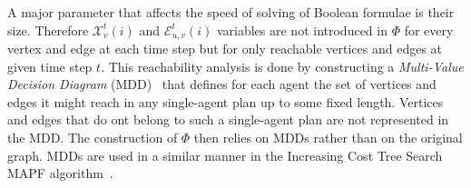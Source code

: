 \documentclass[review]{elsarticle}
\newcommand\konstantin[1]{\nb{\textbf{Konstantin:}}{red}{#1}}
\newcommand\roni[1]{\nb{\textbf{Roni:}}{green}{#1}}
\newcommand\pavel[1]{\nb{\textbf{Pavel:}}{blue}{#1}}
\newcommand{\mddsat}{MDD-SAT\xspace}
\newcommand{\mapf}{\ac{MAPF}\xspace}
\begin{document}
A major parameter that affects the speed of solving of Boolean formulae is their size. Therefore $\mathcal{X}_{v}^{t}(i)$ and $\mathcal{E}_{u,v}^{t}(i)$ variables are not introduced in $\Phi$ for every vertex and edge at each time step but for only reachable vertices and edges at given time step $t$. This reachability analysis is done by constructing a 
{\em Multi-Value Decision Diagram}  (MDD)~\cite{srinivasan1990algorithms} 
that defines for each agent the set of vertices and edges it might reach in any single-agent plan up to some fixed length. Vertices and edges that do ont belong to such a single-agent plan are not represented in the MDD. The construction of $\Phi$ then relies on MDDs rather than on the original graph. MDDs are used in a similar manner in the Increasing Cost Tree Search \mapf algorithm~\cite{sharon2013increasing}.

\end{document}
